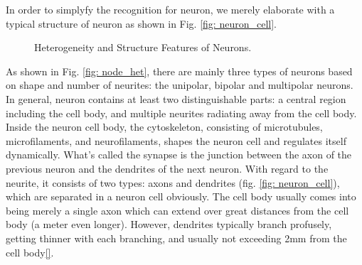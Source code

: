 \documentclass[journal,comsoc]{IEEEtran}
\begin{document}
				In order to simplyfy the recognition for neuron, we merely elaborate with a typical structure of neuron as shown in Fig. \ref{fig: neuron_cell}.
				\begin{figure}[htbp]
					\centering
					\caption{Heterogeneity and Structure Features of Neurons.}
				\end{figure}
				As shown in Fig. \ref{fig: node_het}, there are mainly three types of neurons based on shape and number of neurites: the unipolar, bipolar and multipolar neurons\cite{bear2007neuroscience}. 
				In general, neuron contains  at least two distinguishable parts: 
				a central region including the cell body, and multiple neurites radiating away from the cell body. 
				Inside the neuron cell body, the cytoskeleton, consisting of microtubules, microfilaments, and neurofilaments, shapes the neuron cell and regulates itself dynamically. 
				What's called the synapse is the junction between the axon of the previous neuron and the dendrites of the next neuron.
				With regard to the neurite, it consists of two types: axons and dendrites (fig. \ref{fig: neuron_cell}), which are separated in a neuron cell obviously.
				The cell body usually comes into being merely a single axon which can extend over great distances from the cell body (a meter even longer).
				However, dendrites typically branch profusely, getting thinner with each branching, and usually not exceeding 2mm from the cell body\ref{}.
		
\end{document}
